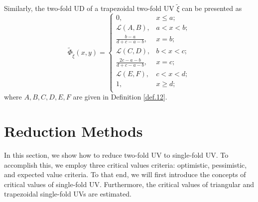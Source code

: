 \begin{remark}
	Similarly, the two-fold UD of a trapezoidal two-fold UV $\tilde{\xi}$ can be presented as 
	\[\tilde{\Phi}_{\tilde{\xi}}(x,y)=\left\{
	\begin{array}{ll}
		0, & x\leq a;\\
		\mathcal{L}(A,B), & a< x< b;\\
		\frac{b-a}{d+c-a-b}, & x=b;\\
		\mathcal{L}(C,D), & b< x< c;\\
		\frac{2c-a-b}{d+c-a-b}, & x=c;\\
		\mathcal{L}(E,F), & c< x< d;\\
		1, & x\geq d;\\
	\end{array}
	\right.
	\]
	where $A,B,C,D,E,F$ are given in Definition \ref{def.12}.
\end{remark}
\section{ Reduction Methods}\label{sec.3} 
	In this section, we show how to reduce two-fold UV to single-fold UV. To accomplish this, we employ three critical values criteria: optimistic, pessimistic, and expected value criteria. To that end, we will first introduce the concepts of critical values of single-fold UV. Furthermore, the critical values of triangular and trapezoidal single-fold UVs are estimated.
